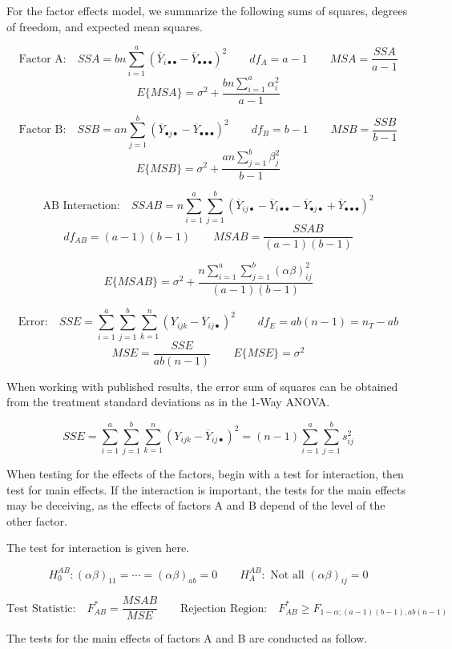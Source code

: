 \documentclass[
]{book}
\begin{document}
For the factor effects model, we summarize the following sums of
squares, degrees of freedom, and expected mean squares.

\[
\mbox{Factor A:} \quad
SSA=bn\sum_{i=1}^a
\left(\overline{Y}_{i\bullet\bullet}-
\overline{Y}_{\bullet\bullet\bullet}\right)^2
\qquad
df_A=a-1
\qquad
MSA=\frac{SSA}{a-1}
\] \[
 E\{MSA\}=\sigma^2+\frac{bn\sum_{i=1}^a\alpha_i^2}{a-1}
\]

\[
\mbox{Factor B:} \quad
SSB=an\sum_{j=1}^b
\left(\overline{Y}_{\bullet j \bullet}-
\overline{Y}_{\bullet\bullet\bullet}\right)^2
\qquad
df_B=b-1
\qquad
MSB=\frac{SSB}{b-1}
\] \[
 E\{MSB\}=\sigma^2+\frac{an\sum_{j=1}^b\beta_j^2}{b-1}
\]

\[
\mbox{AB Interaction:} \quad
SSAB=n\sum_{i=1}^a\sum_{j=1}^b
\left(\overline{Y}_{ij\bullet}-
      \overline{Y}_{i\bullet\bullet} -
      \overline{Y}_{\bullet j \bullet} +
      \overline{Y}_{\bullet\bullet\bullet}\right)^2
\] \[
df_{AB}=(a-1)(b-1)
\qquad
MSAB=\frac{SSAB}{(a-1)(b-1)}
\]

\[
E\{MSAB\}=\sigma^2 + 
\frac{n\sum_{i=1}^a\sum_{j=1}^b(\alpha\beta)_{ij}^2}{(a-1)(b-1)}
\]

\[
\mbox{Error:} \quad
SSE=
\sum_{i=1}^a\sum_{j=1}^b\sum_{k=1}^n
\left(Y_{ijk}-\overline{Y}_{ij\bullet}\right)^2
\qquad
df_E=ab(n-1)=n_T-ab
\] \[
MSE=\frac{SSE}{ab(n-1)}
\qquad
E\{MSE\}=\sigma^2
\]

When working with published results, the error sum of squares can be
obtained from the treatment standard deviations as in the 1-Way ANOVA.

\[
SSE=\sum_{i=1}^a\sum_{j=1}^b\sum_{k=1}^n
\left(Y_{ijk}-\overline{Y}_{ij\bullet}\right)^2=
(n-1)\sum_{i=1}^a\sum_{j=1}^bs_{ij}^2
\]

When testing for the effects of the factors, begin with a test for
interaction, then test for main effects. If the interaction is
important, the tests for the main effects may be deceiving, as the
effects of factors A and B depend of the level of the other factor.

The test for interaction is given here.

\[
H_0^{AB}:\left(\alpha\beta\right)_{11}=\cdots =\left(\alpha\beta\right)_{ab}=0
\qquad
H_A^{AB}: \mbox{ Not all } \left(\alpha\beta\right)_{ij}=0
\]

\[
\mbox{Test Statistic:} \quad F_{AB}^*=\frac{MSAB}{MSE}
\qquad
\mbox{Rejection Region:} \quad F_{AB}^* \ge F_{1-\alpha;(a-1)(b-1),ab(n-1)}
\]

The tests for the main effects of factors A and B are conducted as
follow.
\end{document}
